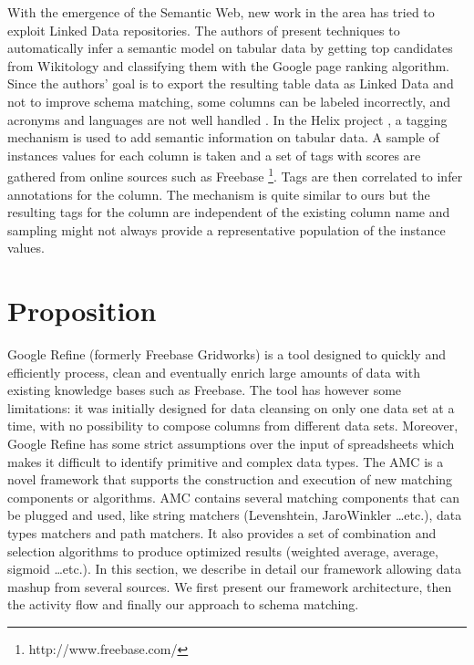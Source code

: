 \documentclass{sig-alternate}
\begin{document}
With the emergence of the Semantic Web, new work in the area has tried to exploit Linked Data repositories. The authors of \cite{Syed2010Tables} present techniques to automatically infer a semantic model on tabular data by getting top candidates from Wikitology \cite{conf/aaaiss/FininSMMP09} and classifying them with the Google page ranking algorithm. Since the authors' goal is to export the resulting table data as Linked Data and not to improve schema matching, some columns can be labeled incorrectly, and acronyms and languages are not well handled \cite{Syed2010Tables}. In the Helix project \cite{conf/www/HassanzadehDFKSW11}, a tagging mechanism is used to add semantic information on tabular data. A sample of instances values for each column is taken and a set of tags with scores are gathered from online sources such as Freebase \footnote{http://www.freebase.com/}. Tags are then correlated to infer annotations for the column. The mechanism is quite similar to ours but the resulting tags for the column are independent of the existing column name and sampling might not always provide a representative population of the instance values.


\section{Proposition}

Google Refine (formerly Freebase Gridworks) is a tool designed to quickly and efficiently process, clean and eventually enrich large amounts of data with existing knowledge bases such as Freebase. The tool has however some limitations: it was initially designed for data cleansing on only one data set at a time, with no possibility to compose columns from different data sets. Moreover, Google Refine has some strict assumptions over the input of spreadsheets which makes it difficult to identify primitive and complex data types.
The AMC is a novel framework that supports the construction and execution of new matching components or algorithms. AMC contains several matching components that can be plugged and used, like string matchers (Levenshtein, JaroWinkler \dots  etc.), data types matchers and path matchers. It also provides a set of combination and selection algorithms to produce optimized results (weighted average, average, sigmoid \dots  etc.).
In this section, we describe in detail our framework allowing data mashup from several sources. We first present our framework architecture, then the activity flow and finally our approach to schema matching.
\end{document}

